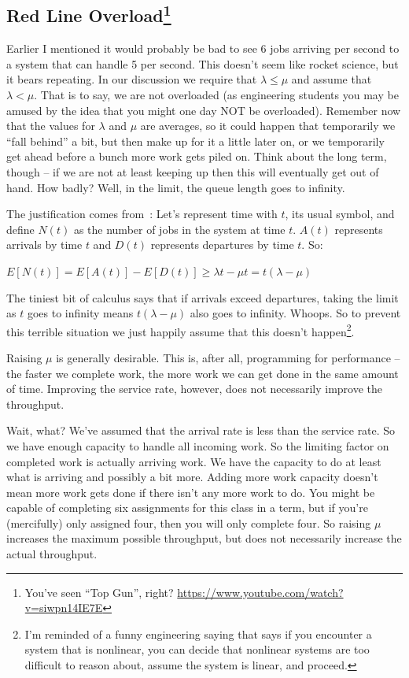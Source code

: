 \subsection*{Red Line Overload\footnote{You've seen ``Top Gun'', right? \url{https://www.youtube.com/watch?v=siwpn14IE7E}}}

Earlier I mentioned it would probably be bad to see 6 jobs arriving per second to a system that can handle 5 per second. This doesn't seem like rocket science, but it bears repeating. In our discussion we require that $\lambda \leq \mu$ and assume that $\lambda < \mu$. That is to say, we are not overloaded (as engineering students you may be amused by the idea that you might one day NOT be overloaded). Remember now that the values for $\lambda$ and $\mu$ are averages, so it could happen that temporarily we ``fall behind'' a bit, but then make up for it a little later on, or we temporarily get ahead before a bunch more work gets piled on. Think about the long term, though -- if we are not at least keeping up then this will eventually get out of hand. How badly? Well, in the limit, the queue length goes to infinity.

The justification comes from~\cite{pmd}: Let's represent time with $t$, its usual symbol, and define $N(t)$ as the number of jobs in the system at time $t$. $A(t)$ represents arrivals by time $t$ and $D(t)$ represents departures by time $t$. So:

\begin{center}
	$E[N(t)] = E[A(t)] - E[D(t)] \geq \lambda t - \mu t = t (\lambda - \mu) $
\end{center}

The tiniest bit of calculus says that if arrivals exceed departures, taking the limit as $t$ goes to infinity means $t (\lambda - \mu) $ also goes to infinity. Whoops. So to prevent this terrible situation we just happily assume that this doesn't happen\footnote{I'm reminded of a funny engineering saying that says if you encounter a system that is nonlinear, you can decide that nonlinear systems are too difficult to reason about, assume the system is linear, and proceed.}. 

Raising $\mu$ is generally desirable. This is, after all, programming for performance -- the faster we complete work, the more work we can get done in the same amount of time. Improving the service rate, however, does not necessarily improve the throughput. 

Wait, what? We've assumed that the arrival rate is less than the service rate. So we have enough capacity to handle all incoming work. So the limiting factor on completed work is actually arriving work. We have the capacity to do at least what is arriving and possibly a bit more. Adding more work capacity doesn't mean more work gets done if there isn't any more work to do. You might be capable of completing six assignments for this class in a term, but if you're (mercifully) only assigned four, then you will only complete four. So raising $\mu$ increases the maximum possible throughput, but does not necessarily increase the actual throughput.

